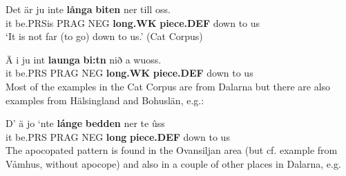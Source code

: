 \ea\label{}
\gll Det  är  ju  inte  \textbf{långa}\textbf{  biten} ner  till  oss.\\
it  be.PRSis  PRAG  NEG  \textbf{long.WK} \textbf{piece.DEF} down  to  us\\
\glt ‘It is not far (to go) down to us.’ (Cat Corpus)
\z

\ea\label{}
\gll Ä  i  ju  int  \textbf{launga} \textbf{bi:tn} nið  a  wuoss.\\
it  be.PRS  PRAG  NEG  \textbf{long.WK} \textbf{piece.DEF} down  to  us\\
\z
Most of the examples in the Cat Corpus are from Dalarna but there are also examples from Hälsingland and Bohuslän, e.g.:


\ea\label{}
\gll D’  ä  jo  ‘nte  \textbf{lánge} \textbf{bedden} ner  te  ûss\\
it  be.PRS  PRAG  NEG  \textbf{long} \textbf{piece.DEF} down  to  us\\
\z
The apocopated pattern is found in the Ovansiljan area (but cf. example from Våmhus, without apocope) and also in a couple of other places in Dalarna, e.g.


